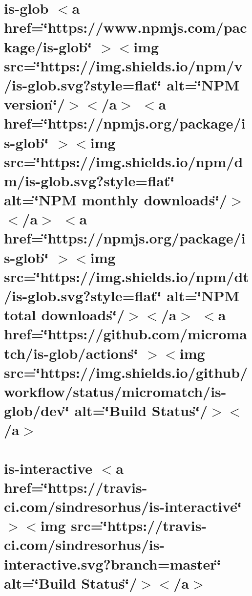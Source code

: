 \documentclass[twoside]{book}
\newcommand{\+}{\discretionary{\mbox{\scriptsize$\hookleftarrow$}}{}{}}
\begin{document}
\chapter{is-\/glob \texorpdfstring{$<$}{<}a href=\char`\"{}https\+://www.\+npmjs.\+com/package/is-\/glob\char`\"{} \texorpdfstring{$>$}{>}\texorpdfstring{$<$}{<}img src=\char`\"{}https\+://img.\+shields.\+io/npm/v/is-\/glob.\+svg?style=flat\char`\"{} alt=\char`\"{}\+NPM version\char`\"{}/\texorpdfstring{$>$}{>}\texorpdfstring{$<$}{<}/a\texorpdfstring{$>$}{>} \texorpdfstring{$<$}{<}a href=\char`\"{}https\+://npmjs.\+org/package/is-\/glob\char`\"{} \texorpdfstring{$>$}{>}\texorpdfstring{$<$}{<}img src=\char`\"{}https\+://img.\+shields.\+io/npm/dm/is-\/glob.\+svg?style=flat\char`\"{} alt=\char`\"{}\+NPM monthly downloads\char`\"{}/\texorpdfstring{$>$}{>}\texorpdfstring{$<$}{<}/a\texorpdfstring{$>$}{>} \texorpdfstring{$<$}{<}a href=\char`\"{}https\+://npmjs.\+org/package/is-\/glob\char`\"{} \texorpdfstring{$>$}{>}\texorpdfstring{$<$}{<}img src=\char`\"{}https\+://img.\+shields.\+io/npm/dt/is-\/glob.\+svg?style=flat\char`\"{} alt=\char`\"{}\+NPM total downloads\char`\"{}/\texorpdfstring{$>$}{>}\texorpdfstring{$<$}{<}/a\texorpdfstring{$>$}{>} \texorpdfstring{$<$}{<}a href=\char`\"{}https\+://github.\+com/micromatch/is-\/glob/actions\char`\"{} \texorpdfstring{$>$}{>}\texorpdfstring{$<$}{<}img src=\char`\"{}https\+://img.\+shields.\+io/github/workflow/status/micromatch/is-\/glob/dev\char`\"{} alt=\char`\"{}\+Build Status\char`\"{}/\texorpdfstring{$>$}{>}\texorpdfstring{$<$}{<}/a\texorpdfstring{$>$}{>}}
\label{md__c___users_vaishnavi_jadhav__desktop__developer_code_mean_stack_example_client_node_modules_is_glob__r_e_a_d_m_e}

\chapter{is-\/interactive \texorpdfstring{$<$}{<}a href=\char`\"{}https\+://travis-\/ci.\+com/sindresorhus/is-\/interactive\char`\"{} \texorpdfstring{$>$}{>}\texorpdfstring{$<$}{<}img src=\char`\"{}https\+://travis-\/ci.\+com/sindresorhus/is-\/interactive.\+svg?branch=master\char`\"{} alt=\char`\"{}\+Build Status\char`\"{}/\texorpdfstring{$>$}{>}\texorpdfstring{$<$}{<}/a\texorpdfstring{$>$}{>}}
\label{md__c___users_vaishnavi_jadhav__desktop__developer_code_mean_stack_example_client_node_modules_is_interactive_readme}

\end{document}
